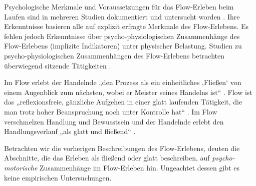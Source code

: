 Psychologische Merkmale und Voraussetzungen für das Flow-Erleben beim Laufen sind in mehreren Studien dokumentiert und untersucht worden \citep{Stoll2005, Reinhardt2006, Schuler2009, Jimenez-Torres2013}. Ihre Erkenntnisse basieren alle auf explizit erfragte Merkmale des Flow-Erlebens. Es fehlen jedoch Erkenntnisse über psycho-physiologischen Zusammenhänge des Flow-Erlebens (implizite Indikatoren) unter physischer Belastung. Studien zu psycho-physiologischen Zusammenhängen des Flow-Erlebens betrachten überwiegend sitzende Tätigkeiten \citep{deManzano2010, Keller2011, Peifer2014, Tozman2015}. 

Im Flow erlebt der Handelnde „den Prozess als ein einheitliches ‚Fließen‘ von einem Augenblick zum nächsten, wobei er Meister seines Handelns ist“ \citep[][S.~59]{Csikszentmihalyi2010}. Flow ist das „reflexionsfreie, gänzliche Aufgehen in einer glatt laufenden Tätigkeit, die man trotz hoher Beanspruchung noch unter Kontrolle hat“ \citep[][S.~156]{Rheinberg2003}. Im Flow verschmelzen Handlung und Bewusstsein und der Handelnde erlebt den Handlungsverlauf „als glatt und fließend“ \citep[][S.~13]{Henk2014}.

Betrachten wir die vorherigen Beschreibungen des Flow-Erlebens, deuten die Abschnitte, die das Erleben als fließend oder glatt beschreiben, auf \emph{psycho-motorische} Zusammenhänge im Flow-Erleben hin. Ungeachtet dessen gibt es keine empirischen Untersuchungen.







